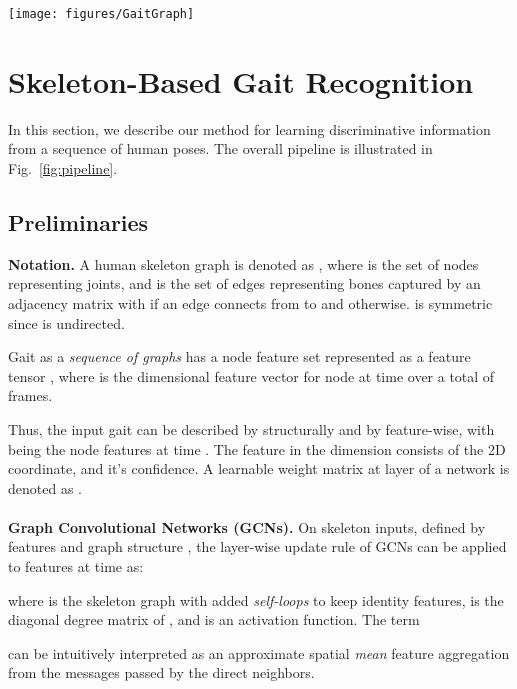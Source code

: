 \documentclass{article}
\newcommand{\nparagraph}[1]{\noindent\textbf{#1.  }}
\begin{document}
\begin{figure*}[ht]
  \begin{center}
\texttt{[image: figures/GaitGraph]}
  \end{center}
  \caption{\textbf{Overview of the Pipeline.} Starting with a sequence of images, for each image a pose is estimated. The sequence of poses is then feed through the ResGCN yielding the feature embedding.}
  \label{fig:pipeline}
\end{figure*}

\section{Skeleton-Based Gait Recognition}
In this section, we describe our method for learning discriminative information from a sequence of human poses. The overall pipeline is illustrated in Fig.~\ref{fig:pipeline}.

\subsection{Preliminaries}

\nparagraph{Notation} A human skeleton graph is denoted as , where  is the set of  nodes representing joints, and  is the set of edges representing bones captured by an adjacency matrix  with  if an edge connects from  to  and  otherwise.
 is symmetric since  is undirected.

Gait as a \textit{sequence of graphs} has a node feature set  represented as a feature tensor , where  is the  dimensional feature vector for node  at time  over a total of  frames.

Thus, the input gait can be described by  structurally and by  feature-wise, with  being the node features at time . The feature  in the  dimension consists of the 2D coordinate, and it's confidence. A learnable weight matrix at layer  of a network is denoted as .\\
\\
\nparagraph{Graph Convolutional Networks (GCNs)}
On skeleton inputs, defined by features  and graph structure , the layer-wise update rule of GCNs can be applied to features at time  as:

where  is the skeleton graph with added \textit{self-loops} to keep identity features,  is the diagonal degree matrix of , and  is an activation function.
The term

can be intuitively interpreted as an approximate spatial \textit{mean} feature aggregation from the messages passed by the direct neighbors.
\end{document}
